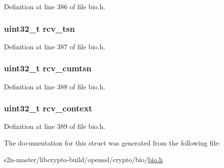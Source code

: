 Definition at line 386 of file bio.\+h.

\subsubsection[{\texorpdfstring{rcv\+\_\+tsn}{rcv_tsn}}]{\setlength{\rightskip}{0pt plus 5cm}uint32\+\_\+t rcv\+\_\+tsn}\hypertarget{structbio__dgram__sctp__rcvinfo_a6b9658186c2748c608e574964973b5c3}{}\label{structbio__dgram__sctp__rcvinfo_a6b9658186c2748c608e574964973b5c3}


Definition at line 387 of file bio.\+h.

\subsubsection[{\texorpdfstring{rcv\+\_\+cumtsn}{rcv_cumtsn}}]{\setlength{\rightskip}{0pt plus 5cm}uint32\+\_\+t rcv\+\_\+cumtsn}\hypertarget{structbio__dgram__sctp__rcvinfo_a49ad4bcb580925ed99be7f5973e893cd}{}\label{structbio__dgram__sctp__rcvinfo_a49ad4bcb580925ed99be7f5973e893cd}


Definition at line 388 of file bio.\+h.

\subsubsection[{\texorpdfstring{rcv\+\_\+context}{rcv_context}}]{\setlength{\rightskip}{0pt plus 5cm}uint32\+\_\+t rcv\+\_\+context}\hypertarget{structbio__dgram__sctp__rcvinfo_a08555da40f69f4dbd029036f729686d1}{}\label{structbio__dgram__sctp__rcvinfo_a08555da40f69f4dbd029036f729686d1}


Definition at line 389 of file bio.\+h.



The documentation for this struct was generated from the following file\+:\begin{DoxyCompactItemize}
\item 
s2n-\/master/libcrypto-\/build/openssl/crypto/bio/\hyperlink{crypto_2bio_2bio_8h}{bio.\+h}\end{DoxyCompactItemize}
